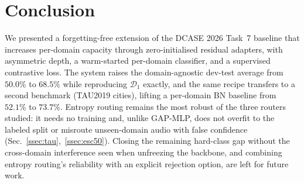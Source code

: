 \documentclass[9pt,conference]{IEEEtran}
\begin{document}
\section{Conclusion}
\label{sec:conclusion}

We presented a forgetting-free extension of the DCASE 2026 Task~7 baseline
that increases per-domain capacity through zero-initialised residual
adapters, with asymmetric depth, a warm-started per-domain classifier, and
a supervised contrastive loss. The system raises the domain-agnostic
dev-test average from $50.0\%$ to $68.5\%$ while reproducing
$\mathcal{D}_1$ exactly, and the same recipe transfers to a second
benchmark (TAU2019 cities), lifting a per-domain BN baseline from $52.1\%$
to $73.7\%$. Entropy routing remains the most robust of the three routers
studied: it needs no training and, unlike GAP-MLP, does not overfit to the
labeled split or misroute unseen-domain audio with false confidence
(Sec.~\ref{ssec:tau},~\ref{ssec:esc50}). Closing the remaining hard-class
gap without the cross-domain interference seen when unfreezing the
backbone, and combining entropy routing's reliability with an explicit
rejection option, are left for future work.




\end{document}
